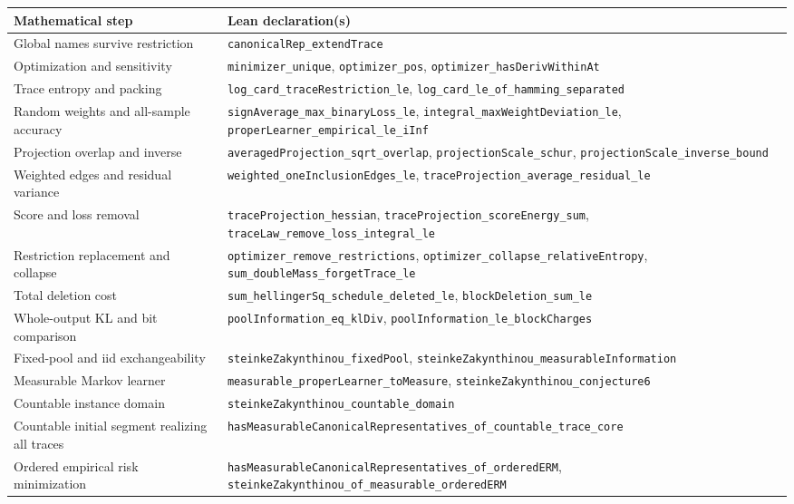 \documentclass[11pt]{article}
\theoremstyle{definition}\newtheorem{definition}[theorem]{Definition}
\newcommand{\decl}[1]{{\small\nolinkurl{#1}}}
\begin{document}
{\small\setlength{\tabcolsep}{4pt}\renewcommand{\arraystretch}{1.13}
\begin{longtable}{@{}>{\raggedright\arraybackslash}p{.36\linewidth}>{\raggedright\arraybackslash}p{.60\linewidth}@{}}
\toprule Mathematical step & Lean declaration(s) \\ \midrule \endhead
Global names survive restriction & \decl{canonicalRep_extendTrace} \\
Optimization and sensitivity & \decl{minimizer_unique}, \decl{optimizer_pos}, \decl{optimizer_hasDerivWithinAt} \\
Trace entropy and packing & \decl{log_card_traceRestriction_le}, \decl{log_card_le_of_hamming_separated} \\
Random weights and all-sample accuracy & \decl{signAverage_max_binaryLoss_le}, \decl{integral_maxWeightDeviation_le}, \decl{properLearner_empirical_le_iInf} \\
Projection overlap and inverse & \decl{averagedProjection_sqrt_overlap}, \decl{projectionScale_schur}, \decl{projectionScale_inverse_bound} \\
Weighted edges and residual variance & \decl{weighted_oneInclusionEdges_le}, \decl{traceProjection_average_residual_le} \\
Score and loss removal & \decl{traceProjection_hessian}, \decl{traceProjection_scoreEnergy_sum}, \decl{traceLaw_remove_loss_integral_le} \\
Restriction replacement and collapse & \decl{optimizer_remove_restrictions}, \decl{optimizer_collapse_relativeEntropy}, \decl{sum_doubleMass_forgetTrace_le} \\
Total deletion cost & \decl{sum_hellingerSq_schedule_deleted_le}, \decl{blockDeletion_sum_le} \\
Whole-output KL and bit comparison & \decl{poolInformation_eq_klDiv}, \decl{poolInformation_le_blockCharges} \\
Fixed-pool and iid exchangeability & \decl{steinkeZakynthinou_fixedPool}, \decl{steinkeZakynthinou_measurableInformation} \\
Measurable Markov learner & \decl{measurable_properLearner_toMeasure}, \decl{steinkeZakynthinou_conjecture6} \\
Countable instance domain & \decl{steinkeZakynthinou_countable_domain} \\
Countable initial segment realizing all traces & \decl{hasMeasurableCanonicalRepresentatives_of_countable_trace_core} \\
Ordered empirical risk minimization & \decl{hasMeasurableCanonicalRepresentatives_of_orderedERM}, \decl{steinkeZakynthinou_of_measurable_orderedERM} \\

\end{longtable}}
\end{document}
